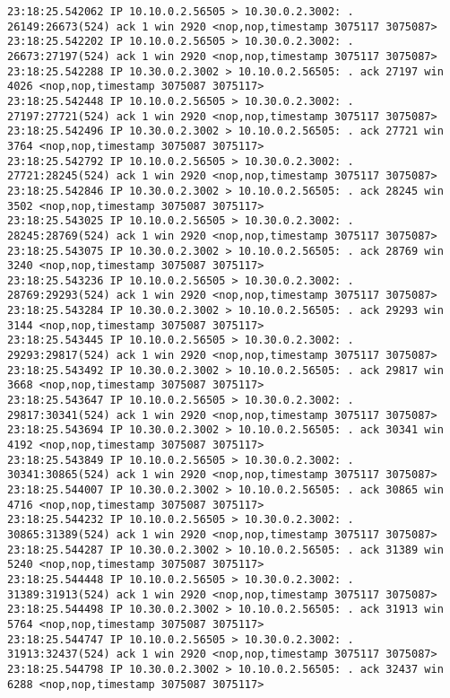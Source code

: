 \documentclass[a4paper,12pt]{article}
\begin{document}
\begin{Verbatim}
23:18:25.542062 IP 10.10.0.2.56505 > 10.30.0.2.3002: . 26149:26673(524) ack 1 win 2920 <nop,nop,timestamp 3075117 3075087>
23:18:25.542202 IP 10.10.0.2.56505 > 10.30.0.2.3002: . 26673:27197(524) ack 1 win 2920 <nop,nop,timestamp 3075117 3075087>
23:18:25.542288 IP 10.30.0.2.3002 > 10.10.0.2.56505: . ack 27197 win 4026 <nop,nop,timestamp 3075087 3075117>
23:18:25.542448 IP 10.10.0.2.56505 > 10.30.0.2.3002: . 27197:27721(524) ack 1 win 2920 <nop,nop,timestamp 3075117 3075087>
23:18:25.542496 IP 10.30.0.2.3002 > 10.10.0.2.56505: . ack 27721 win 3764 <nop,nop,timestamp 3075087 3075117>
23:18:25.542792 IP 10.10.0.2.56505 > 10.30.0.2.3002: . 27721:28245(524) ack 1 win 2920 <nop,nop,timestamp 3075117 3075087>
23:18:25.542846 IP 10.30.0.2.3002 > 10.10.0.2.56505: . ack 28245 win 3502 <nop,nop,timestamp 3075087 3075117>
23:18:25.543025 IP 10.10.0.2.56505 > 10.30.0.2.3002: . 28245:28769(524) ack 1 win 2920 <nop,nop,timestamp 3075117 3075087>
23:18:25.543075 IP 10.30.0.2.3002 > 10.10.0.2.56505: . ack 28769 win 3240 <nop,nop,timestamp 3075087 3075117>
23:18:25.543236 IP 10.10.0.2.56505 > 10.30.0.2.3002: . 28769:29293(524) ack 1 win 2920 <nop,nop,timestamp 3075117 3075087>
23:18:25.543284 IP 10.30.0.2.3002 > 10.10.0.2.56505: . ack 29293 win 3144 <nop,nop,timestamp 3075087 3075117>
23:18:25.543445 IP 10.10.0.2.56505 > 10.30.0.2.3002: . 29293:29817(524) ack 1 win 2920 <nop,nop,timestamp 3075117 3075087>
23:18:25.543492 IP 10.30.0.2.3002 > 10.10.0.2.56505: . ack 29817 win 3668 <nop,nop,timestamp 3075087 3075117>
23:18:25.543647 IP 10.10.0.2.56505 > 10.30.0.2.3002: . 29817:30341(524) ack 1 win 2920 <nop,nop,timestamp 3075117 3075087>
23:18:25.543694 IP 10.30.0.2.3002 > 10.10.0.2.56505: . ack 30341 win 4192 <nop,nop,timestamp 3075087 3075117>
23:18:25.543849 IP 10.10.0.2.56505 > 10.30.0.2.3002: . 30341:30865(524) ack 1 win 2920 <nop,nop,timestamp 3075117 3075087>
23:18:25.544007 IP 10.30.0.2.3002 > 10.10.0.2.56505: . ack 30865 win 4716 <nop,nop,timestamp 3075087 3075117>
23:18:25.544232 IP 10.10.0.2.56505 > 10.30.0.2.3002: . 30865:31389(524) ack 1 win 2920 <nop,nop,timestamp 3075117 3075087>
23:18:25.544287 IP 10.30.0.2.3002 > 10.10.0.2.56505: . ack 31389 win 5240 <nop,nop,timestamp 3075087 3075117>
23:18:25.544448 IP 10.10.0.2.56505 > 10.30.0.2.3002: . 31389:31913(524) ack 1 win 2920 <nop,nop,timestamp 3075117 3075087>
23:18:25.544498 IP 10.30.0.2.3002 > 10.10.0.2.56505: . ack 31913 win 5764 <nop,nop,timestamp 3075087 3075117>
23:18:25.544747 IP 10.10.0.2.56505 > 10.30.0.2.3002: . 31913:32437(524) ack 1 win 2920 <nop,nop,timestamp 3075117 3075087>
23:18:25.544798 IP 10.30.0.2.3002 > 10.10.0.2.56505: . ack 32437 win 6288 <nop,nop,timestamp 3075087 3075117>

\end{Verbatim}
\end{document}

